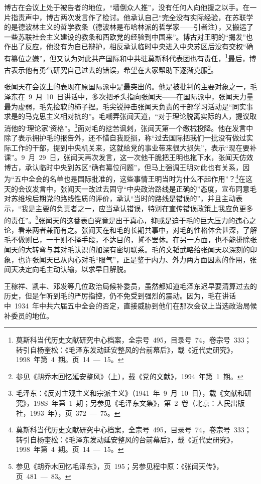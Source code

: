 博古在会议上处于被告者的地位，“墙倒众人推”，没有任何人向他援之以手。在一片指责声中，博古两次发言作了检讨。他承认自己“完全没有实际经验，在苏联学的是德波林主义的哲学教条（德波林是布哈林派的哲学家——引者注），又搬运了一些苏联社会主义建设的教条和西欧党的经验到中国来”。博古对王明的“揭发”也作出了反应，他没有为自已辩护，相反承认临时中央进入中央苏区后没有交权“确有纂位之嫌”，但又认为对此共产国际和中共驻莫斯科代表团也有责任，\footnote{莫斯科当代历史文献研究中心档案，全宗号~495，目录号~74，卷宗号~333；转引自杨奎松：《毛泽东发动延安整风的台前幕后》，载《近代史研究》，1998~年第~4~期。页~14~—~15。}最后，博古表示他有勇气研究自己过去的错误，希望在大家帮助下逐渐克服\footnote{参见《胡乔木回忆延安整风》（上），载《党的文献》，1994~年第~1~期。}。

张闻天在会议上的表现在原国际派中是最突出的。他是被批判的主要对象之一，毛泽东在~9~月~10~日讲话中，多次把矛头指向张闻天——在国际派中，张闻天力量最为虚弱，毛先捡软的柿子捏。毛尖锐抨击张闻天负责的干部学习活动是“同实事求是的马克思主义相对抗的”。毛嘲弄张闻天道，“对于理论脱离实际的人，提议取消他的‘理论家’资格”。\footnote{毛泽东：《反对主观主义和宗派主义》（1941~年~9~月~10~日），载《文献和研究》，198S~年第~1~期；另参见《毛泽东文集》，第~2~卷（北京：人民出版社，1993~年），页~372~—~75。}面对毛的挖苦讽刺，张闻天第一个缴械投降。他在发言中除了表示拥护毛的报告外，还不惜自我贬损，称“过去国际把我们一批没有做过实际工作的干部，提到中央机关来，这就给党的事业带来很大损失”，表示“现在要补课”。9~月~29~日，张闻天再次发言，这一次他干脆把王明也拖下水，张闻天仿效博古，承认临时中央到苏区“确有纂位问题”，但马上强调王明对此也有关系，因为“五中全会的名单也是国际批准的，这些事情王明当时为什么不起作用”？\footnote{莫斯科当代历史文献研究中心档案，全宗号~495，目录号~74，卷宗号~333；转引自杨奎松：《毛泽东发动延安整风的台前幕后》，载《近代史研究》，1998~年第~4~期。页~14~—~15。}在这天的会议发言中，张闻天一改过去固守“中央政治路线是正确的”态度，宣布同意毛对苏维埃后期党的路线性质的评价，承认“当时的路线是错误的”，并且主动表示，“我是主要的负责者之一，应当承认错误，特别在宣传错误政策上我应负更多的责任”。\footnote{参见《胡乔木回忆毛泽东》，页~195；另参见程中原：《张闻天传》，页~481~—~83。}张闻天的这番表白究竟是出于真心，抑或是迫于毛的巨大压力的违心之论，看来两者兼而有之。张闻天在和毛的长期共事中，对毛的性格体会甚深，了解毛不做则已，一干则不择手段，不达目的，誓不罢休。在另一方面，也不能排除张闻天的大转弯与其对毛认识的加深有密切联系。毛的文韬武略给张闻天以深刻的印象，也许张闻天已从内心对毛“服气”，正是鉴于内力、外力两方面因素的作用，张闻天决定向毛主动认输，以求早日解脱。

王稼祥、凯丰、邓发等几位政治局候补委员，虽然都知道毛泽东迟早要清算过去的历史，但是乍听到毛的严厉指控，仍不免受到强烈的震动。因为，毛在讲话中~1934~年中共六届五中全会的否定，直接威胁到他们在那次会议上当选政治局候补委员的地位。

